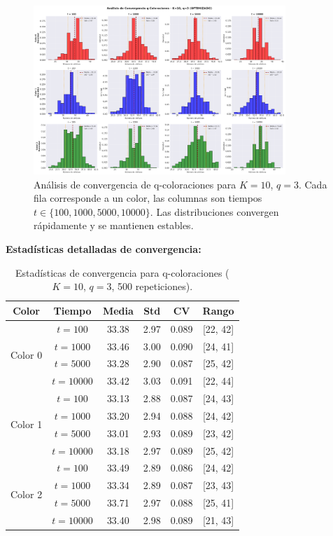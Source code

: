 \begin{figure}[H]
\centering
\includegraphics[width=0.85\textwidth]{../images/coloracion_convergencia_K10_q3.png}
\caption{Análisis de convergencia de q-coloraciones para $K=10$, $q=3$. Cada fila corresponde a un color, las columnas son tiempos $t \in \{100, 1000, 5000, 10000\}$. Las distribuciones convergen rápidamente y se mantienen estables.}
\end{figure}

\textbf{Estadísticas detalladas de convergencia:}

\begin{table}[H]
\centering
\begin{tabular}{|c|c|c|c|c|c|}
\hline
\textbf{Color} & \textbf{Tiempo} & \textbf{Media} & \textbf{Std} & \textbf{CV} & \textbf{Rango} \\
\hline
\multirow{4}{*}{Color 0} & $t=100$ & 33.38 & 2.97 & 0.089 & [22, 42] \\
& $t=1000$ & 33.46 & 3.00 & 0.090 & [24, 41] \\
& $t=5000$ & 33.28 & 2.90 & 0.087 & [25, 42] \\
& $t=10000$ & 33.42 & 3.03 & 0.091 & [22, 44] \\
\hline
\multirow{4}{*}{Color 1} & $t=100$ & 33.13 & 2.88 & 0.087 & [24, 43] \\
& $t=1000$ & 33.20 & 2.94 & 0.088 & [24, 42] \\
& $t=5000$ & 33.01 & 2.93 & 0.089 & [23, 42] \\
& $t=10000$ & 33.18 & 2.97 & 0.089 & [25, 42] \\
\hline
\multirow{4}{*}{Color 2} & $t=100$ & 33.49 & 2.89 & 0.086 & [24, 42] \\
& $t=1000$ & 33.34 & 2.89 & 0.087 & [23, 43] \\
& $t=5000$ & 33.71 & 2.97 & 0.088 & [25, 41] \\
& $t=10000$ & 33.40 & 2.98 & 0.089 & [21, 43] \\
\hline
\end{tabular}
\caption{Estadísticas de convergencia para q-coloraciones ($K=10$, $q=3$, 500 repeticiones).}
\end{table}

